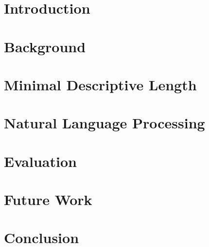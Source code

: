 \documentclass{sig-alternate-05-2015}
\begin{document}
%
%

%
%
\printccsdesc


\section{Introduction} \label{sec:intro}


\section{Background} \label{sec:background}


\section{Minimal Descriptive Length} \label{sec:mdl}


\section{Natural Language Processing} \label{sec:nlp}


\section{Evaluation} \label{sec:experiments}


\section{Future Work} \label{sec:future}


\section{Conclusion} \label{sec:conclusion}


%

%

%
%

\end{document}
